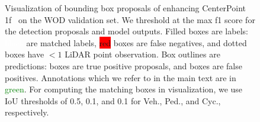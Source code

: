 \begin{figure}
\begin{tikzpicture}
\end{tikzpicture}
\caption{Visualization of bounding box proposals of \ourmodel{} enhancing CenterPoint 1f~\cite{centerpoint} on the WOD validation set.
We threshold at the max f1 score for the detection proposals and model outputs.
Filled boxes are labels: \colorbox{gt}{\textcolor{white}{black}} are matched labels, \colorbox{red}{red} boxes are false negatives,
and dotted boxes have $< 1$ LiDAR point observation.
Box outlines are predictions: \textcolor{tp}{} boxes are true positive proposals, and \textcolor{fp}{} boxes are false positives.
Annotations which we refer to in the main text are in \textcolor{green}{green}.
For computing the matching boxes in visualization, we use IoU thresholds of 0.5, 0.1, and 0.1 for Veh., Ped., and Cyc., respectively.
}
\label{fig:supp-quali}
\end{figure}